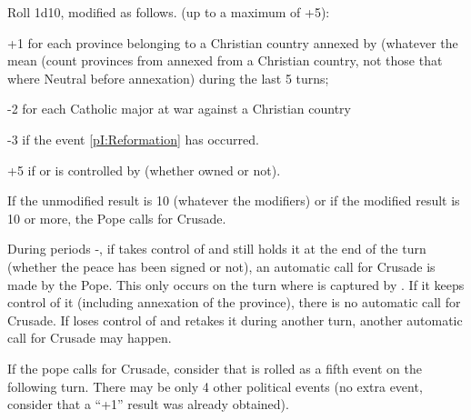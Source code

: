 \bparag Roll 1d10, modified as follows.
\bparag[Modifiers] (up to a maximum of +5):
\begin{modlist}
\item[+1] for each province belonging to a Christian country annexed by \TUR
  (whatever the mean (count provinces from \regionBalkans annexed from a
  Christian country, not those that where Neutral before annexation) during
  the last 5 turns;
\item[-2] for each Catholic major at war against a Christian country
\item[-3] if the event \ref{pI:Reformation} has occurred.
\item[+5] if \villeVienne or \villeRoma is controlled by \TUR (whether owned
  or not).
\end{modlist}
\bparag If the unmodified result is 10 (whatever the modifiers) or if the
modified result is 10 or more, the Pope calls for Crusade.

\aparag[\villeRoma] During periods -, if \TUR takes
control of \villeRoma and still holds it at the end of the turn (whether the
peace has been signed or not), an automatic call for Crusade is made by the
Pope.
\bparag This only occurs on the turn where \villeRoma is captured by \TUR. If
it keeps control of it (including annexation of the province), there is no
automatic call for Crusade. If \TUR loses control of \villeRoma and retakes it
during another turn, another automatic call for Crusade may happen.

\aparag[Crusade] If the pope calls for Crusade, consider that
 is rolled as a fifth event on the following turn. There
may be only 4 other political events (no extra event, consider that a ``+1''
result was already obtained).


